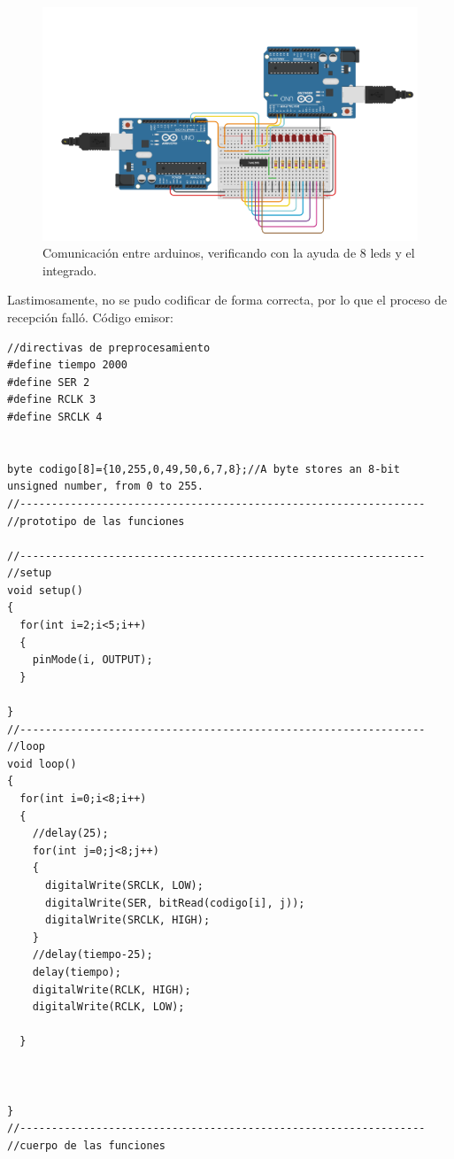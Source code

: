 \documentclass{article}
\begin{document}
\begin{figure}[h]
\includegraphics[scale=0.6]{prueba conexión entre arduinos (fallo).png}
\centering
\caption{Comunicación entre arduinos, verificando con la ayuda de 8 leds y el integrado.}
\label{fig:reemplazo pulsador por arduino}
\end{figure}
Lastimosamente, no se pudo codificar de forma correcta, por lo que el proceso de recepción falló.
\newline Código emisor:
\begin{lstlisting}[style=myArduino]
//directivas de preprocesamiento
#define tiempo 2000
#define SER 2
#define RCLK 3
#define SRCLK 4


byte codigo[8]={10,255,0,49,50,6,7,8};//A byte stores an 8-bit unsigned number, from 0 to 255.
//----------------------------------------------------------------
//prototipo de las funciones

//----------------------------------------------------------------
//setup
void setup()
{
  for(int i=2;i<5;i++)
  {
    pinMode(i, OUTPUT);
  }
  
}
//----------------------------------------------------------------
//loop
void loop()
{
  for(int i=0;i<8;i++)
  {
  	//delay(25);
    for(int j=0;j<8;j++)
    {
      digitalWrite(SRCLK, LOW);
      digitalWrite(SER, bitRead(codigo[i], j));
      digitalWrite(SRCLK, HIGH);
    }
    //delay(tiempo-25);
    delay(tiempo);
    digitalWrite(RCLK, HIGH);
    digitalWrite(RCLK, LOW);
    
  }
  
  
  
}
//----------------------------------------------------------------
//cuerpo de las funciones
\end{lstlisting}
\end{document}
